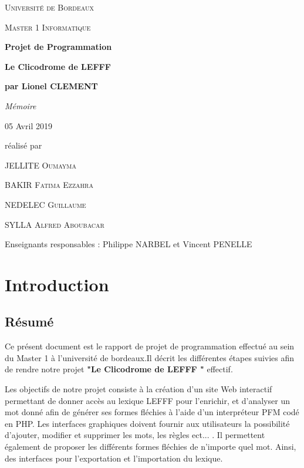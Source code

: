 \documentclass[12pt,a4paper]{article}
\begin{document}
\begin{titlepage}
\centering
{\scshape\LARGE Université de Bordeaux \par}
{\scshape\Large Master 1 Informatique  \par}
\vspace{3cm}

{\Huge\bfseries Projet de Programmation\par}
{\Huge\bfseries Le Clicodrome de LEFFF \par}
{\Large\bfseries par Lionel CLEMENT \par}
\vspace{0.5cm}
{\Large\itshape Mémoire \par}
{\large 05 Avril 2019\par}

\vfill
réalisé par \par
JELLITE \textsc{Oumayma} \par
BAKIR \textsc{Fatima Ezzahra} \par
NEDELEC \textsc{Guillaume} \par
SYLLA  \textsc{Alfred Aboubacar} \par
\vfill

{\large Enseignants responsables : Philippe NARBEL et Vincent PENELLE\par}

\end{titlepage}

\newpage
\tableofcontents
\newpage
\listoffigures

\newpage\section{Introduction}

\subsection{Résumé}
 Ce présent document est le rapport de projet de programmation effectué au sein du Master 1 à l'université de bordeaux.Il décrit les différentes étapes suivies afin de rendre notre projet  \textbf{"Le Clicodrome de LEFFF "} effectif.

 Les objectifs de notre projet consiste à la création d'un site Web interactif permettant de donner accès
au lexique LEFFF pour l'enrichir, et d'analyser un mot donné afin de générer ses formes fléchies à l'aide  d'un interpréteur PFM codé en PHP.
Les interfaces graphiques doivent fournir aux utilisateurs la possibilité d'ajouter, modifier et supprimer les mots, les règles ect... .
Il permettent également de proposer les différents formes fléchies de n'importe quel mot. Ainsi, des interfaces pour l'exportation et l'importation du lexique. 
\end{document}
